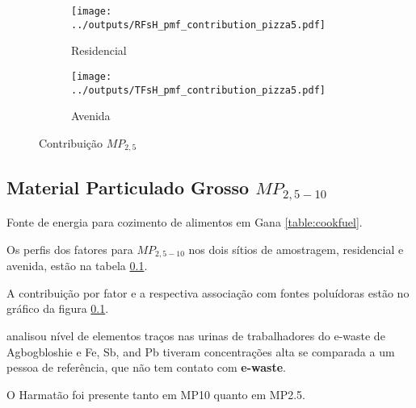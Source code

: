 \begin{figure}[H]
  \centering
  \begin{subfigure}[b]{0.45\textwidth}
    \texttt{[image: ../outputs/RFsH\_pmf\_contribution\_pizza5.pdf]}
    \caption{Residencial}
  \end{subfigure}%
  \begin{subfigure}[b]{0.45\textwidth}
    \texttt{[image: ../outputs/TFsH\_pmf\_contribution\_pizza5.pdf]}
    \caption{Avenida}
  \end{subfigure}
  \caption{Contribuição $MP_{2,5}$ \label{a:kkk}}
\end{figure}

\subsection{Material Particulado Grosso $MP_{2,5-10}$}

Fonte de energia para cozimento de alimentos em Gana \ref{table:cookfuel}.
\begin{table}[H]
 \centering
  
  \caption{Fontes de energia usadas para cozimento de alimentos em 
           Gana \citep{ghanacensus2013} \label{table:cookfuel}}
\end{table}

Os perfis dos fatores para $MP_{2,5-10}$ nos dois sítios de amostragem, 
residencial e avenida, estão na tabela \ref{}.

A contribuição por fator e a respectiva associação com fontes poluídoras
estão no gráfico da figura \ref{}. 

\citep{asante2012} analisou nível de elementos traços nas urinas de trabalhadores 
do e-waste de Agbogbloshie e Fe, Sb, and Pb tiveram concentrações alta se comparada
a um pessoa de referência, que não tem contato com \textbf{e-waste}.

O Harmatão foi presente tanto em MP10 quanto em MP2.5.

\begin{table}[H]
  
  \caption{Análise de Fatores para $MP_{2,5-10}$ na área residencial
           excluindo-se dias de ocorrência do Harmatão.
           Rotação varimax - 5 fatores retidos (n=).
           (\textcolor{red}{h} : Comunalidade; 
           \textcolor{red}{S=1-h} : Singularidade; 
           \textcolor{red}{C} : Complexidade.)
           \label{table:beautifulFAdisplay_RGsH4}}
\end{table}

